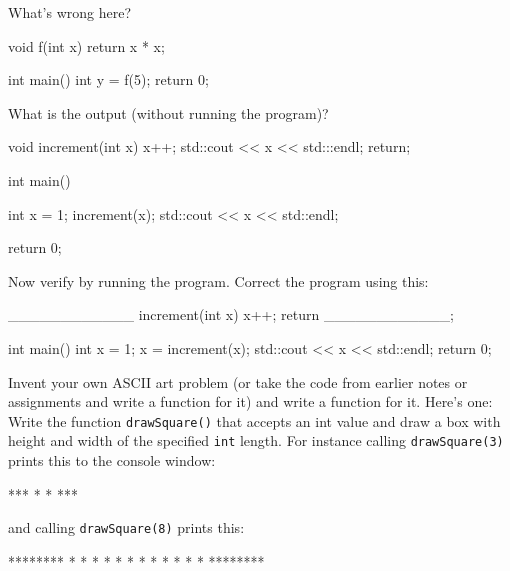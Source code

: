 \begin{ex}
What's wrong here?

\begin{consolethree}[escapeinside=||]
void f(int x)
{
    return x * x;
}

int main()
{
    int y = f(5);
    return 0;
}
\end{consolethree}
\end{ex}

\begin{ex}
What is the output (without running the program)?

\begin{consolethree}[escapeinside=||]
void increment(int x)
{
    x++;
    std::cout << x << std:::endl;
    return;
}

int main()
{
    int x = 1;
    increment(x);
    std::cout << x << std::endl;

    return 0;
}
\end{consolethree}

Now verify by running the program. Correct the program using this:

\begin{consolethree}[escapeinside=||]
____________ increment(int x)
{
    x++;
    return ____________;
}

int main()
{
    int x = 1;
    x = increment(x);
    std::cout << x << std::endl;
    return 0;
}
\end{consolethree}
\end{ex}

\begin{ex}
Invent your own ASCII art problem (or take the code from earlier notes or assignments and write a function for it) and write a function for it. Here's one: Write the function \texttt{drawSquare()} that accepts an int value and draw a box with height and width of the specified \texttt{int} length. For instance calling \texttt{drawSquare(3)} prints this to the console window:

\begin{console}
***
* *
***
\end{console}

and calling \texttt{drawSquare(8)} prints this:

\begin{console}
********
*      *
*      *
*      *
*      *
*      *
*      *
********
\end{console}
\end{ex}


\newpage{}

